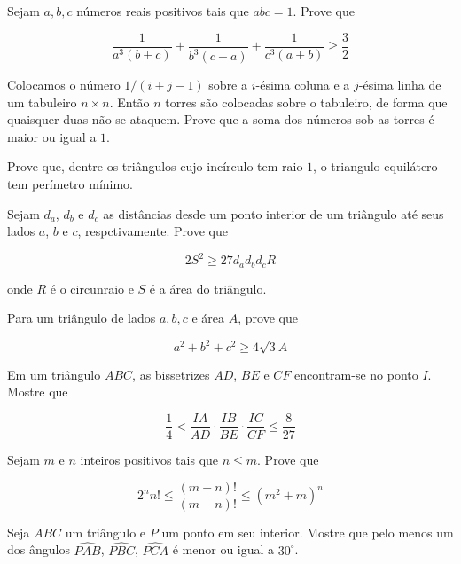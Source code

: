 \begin{questao}
  Sejam $a,b,c$ números reais positivos tais que $abc=1$. Prove que

  $$ \frac{1}{a^3(b+c)} + \frac{1}{b^3(c+a)} + \frac{1}{c^3(a+b)} \geq
  \frac{3}{2} $$
\end{questao}

\begin{questao}
  Colocamos o número $1/(i+j-1)$ sobre a $i$-ésima coluna e a $j$-ésima linha de
  um tabuleiro $n \times n$. Então $n$ torres são colocadas sobre o tabuleiro,
  de forma que quaisquer duas não se ataquem. Prove que a soma dos números sob
  as torres é maior ou igual a $1$.
\end{questao}

\begin{questao}
  Prove que, dentre os triângulos cujo incírculo tem raio $1$, o triangulo
  equilátero tem perímetro mínimo.
\end{questao}

\begin{questao}
  Sejam $d_a$, $d_b$ e $d_c$ as distâncias desde um ponto interior de um
  triângulo até seus lados $a$, $b$ e $c$, respctivamente. Prove que

  $$ 2S^2 \geq 27d_ad_bd_cR $$

  onde $R$ é o circunraio e $S$ é a área do triângulo.
\end{questao}

\begin{questao}
  Para um triângulo de lados $a,b,c$ e área $A$, prove que

  $$ a^2+b^2+c^2 \geq 4\sqrt{3}A $$
\end{questao}

\begin{questao}
  Em um triângulo $ABC$, as bissetrizes $AD$, $BE$ e $CF$ encontram-se no ponto
  $I$. Mostre que

  $$ \frac{1}{4} < \frac{IA}{AD} \cdot \frac{IB}{BE} \cdot \frac{IC}{CF} \leq
  \frac{8}{27} $$
\end{questao}

\begin{questao}
  Sejam $m$ e $n$ inteiros positivos tais que $n \leq m$. Prove que

  $$ 2^nn! \leq \frac{(m+n)!}{(m-n)!} \leq (m^2+m)^n $$
\end{questao}

\begin{questao}
  Seja $ABC$ um triângulo e $P$ um ponto em seu interior. Mostre que pelo menos
  um dos ângulos $\widehat{PAB}$, $\widehat{PBC}$, $\widehat{PCA}$ é menor ou
  igual a $30^\circ$.
\end{questao}

